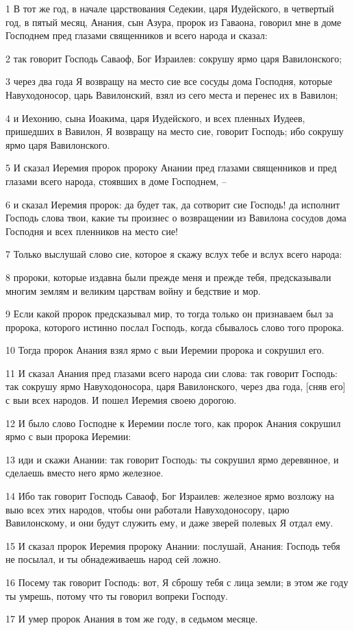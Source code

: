 \par 1 В тот же год, в начале царствования Седекии, царя Иудейского, в четвертый год, в пятый месяц, Анания, сын Азура, пророк из Гаваона, говорил мне в доме Господнем пред глазами священников и всего народа и сказал:
\par 2 так говорит Господь Саваоф, Бог Израилев: сокрушу ярмо царя Вавилонского;
\par 3 через два года Я возвращу на место сие все сосуды дома Господня, которые Навуходоносор, царь Вавилонский, взял из сего места и перенес их в Вавилон;
\par 4 и Иехонию, сына Иоакима, царя Иудейского, и всех пленных Иудеев, пришедших в Вавилон, Я возвращу на место сие, говорит Господь; ибо сокрушу ярмо царя Вавилонского.
\par 5 И сказал Иеремия пророк пророку Анании пред глазами священников и пред глазами всего народа, стоявших в доме Господнем, --
\par 6 и сказал Иеремия пророк: да будет так, да сотворит сие Господь! да исполнит Господь слова твои, какие ты произнес о возвращении из Вавилона сосудов дома Господня и всех пленников на место сие!
\par 7 Только выслушай слово сие, которое я скажу вслух тебе и вслух всего народа:
\par 8 пророки, которые издавна были прежде меня и прежде тебя, предсказывали многим землям и великим царствам войну и бедствие и мор.
\par 9 Если какой пророк предсказывал мир, то тогда только он признаваем был за пророка, которого истинно послал Господь, когда сбывалось слово того пророка.
\par 10 Тогда пророк Анания взял ярмо с выи Иеремии пророка и сокрушил его.
\par 11 И сказал Анания пред глазами всего народа сии слова: так говорит Господь: так сокрушу ярмо Навуходоносора, царя Вавилонского, через два года, [сняв его] с выи всех народов. И пошел Иеремия своею дорогою.
\par 12 И было слово Господне к Иеремии после того, как пророк Анания сокрушил ярмо с выи пророка Иеремии:
\par 13 иди и скажи Анании: так говорит Господь: ты сокрушил ярмо деревянное, и сделаешь вместо него ярмо железное.
\par 14 Ибо так говорит Господь Саваоф, Бог Израилев: железное ярмо возложу на выю всех этих народов, чтобы они работали Навуходоносору, царю Вавилонскому, и они будут служить ему, и даже зверей полевых Я отдал ему.
\par 15 И сказал пророк Иеремия пророку Анании: послушай, Анания: Господь тебя не посылал, и ты обнадеживаешь народ сей ложно.
\par 16 Посему так говорит Господь: вот, Я сброшу тебя с лица земли; в этом же году ты умрешь, потому что ты говорил вопреки Господу.
\par 17 И умер пророк Анания в том же году, в седьмом месяце.

